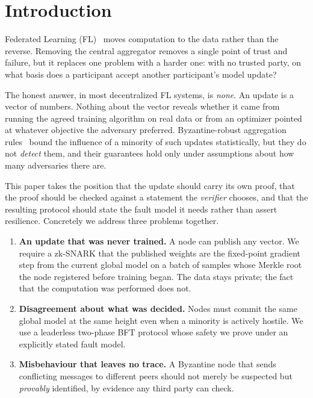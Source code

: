 \documentclass{llncs}
\begin{document}
\section{Introduction}

Federated Learning (FL)~\cite{mcmahan2017fedavg} moves computation to the data
rather than the reverse. Removing the central aggregator removes a single point
of trust and failure, but it replaces one problem with a harder one: with no
trusted party, on what basis does a participant accept another participant's
model update?

The honest answer, in most decentralized FL systems, is \emph{none}. An update
is a vector of numbers. Nothing about the vector reveals whether it came from
running the agreed training algorithm on real data or from an optimizer pointed
at whatever objective the adversary preferred. Byzantine-robust aggregation
rules~\cite{blanchard2017krum,yin2018trimmedmean,cao2021fltrust} bound the
influence of a minority of such updates statistically, but they do not
\emph{detect} them, and their guarantees hold only under assumptions about how
many adversaries there are.

This paper takes the position that the update should carry its own proof, that
the proof should be checked against a statement the \emph{verifier} chooses, and
that the resulting protocol should state the fault model it needs rather than
assert resilience. Concretely we address three problems together.

\begin{enumerate}
  \item \textbf{An update that was never trained.} A node can publish any
    vector. We require a zk-SNARK that the published weights are the fixed-point
    gradient step from the current global model on a batch of samples whose
    Merkle root the node registered before training began. The data stays
    private; the fact that the computation was performed does not.
  \item \textbf{Disagreement about what was decided.} Nodes must commit the same
    global model at the same height even when a minority is actively hostile. We
    use a leaderless two-phase BFT protocol whose safety we prove under an
    explicitly stated fault model.
  \item \textbf{Misbehaviour that leaves no trace.} A Byzantine node that sends
    conflicting messages to different peers should not merely be suspected but
    \emph{provably} identified, by evidence any third party can check.
\end{enumerate}
\end{document}
